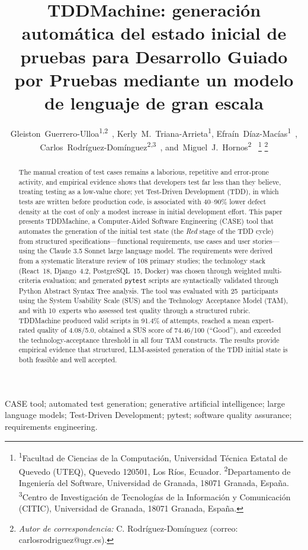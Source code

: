 \documentclass[10pt,journal,twoside,letterpaper]{IEEEtran}
\author{%
	Gleiston~Guerrero-Ulloa\textsuperscript{1,2}~\orcidlink{0000-0001-5990-2357},
	Kerly~M.~Triana-Arrieta\textsuperscript{1},
	Efraín~Díaz-Macías\textsuperscript{1}~\orcidlink{0000-0003-4087-029X},
	Carlos~Rodríguez-Domínguez\textsuperscript{2,3}~\orcidlink{0000-0001-5626-3115},
	and~Miguel~J.~Hornos\textsuperscript{2}~\orcidlink{0000-0001-5722-9816}%
	\thanks{\textsuperscript{1}Facultad de Ciencias de la Computación, Universidad Técnica Estatal de Quevedo (UTEQ), Quevedo 120501, Los Ríos, Ecuador. \textsuperscript{2}Departamento de Ingeniería del Software, Universidad de Granada, 18071 Granada, España. \textsuperscript{3}Centro de Investigación de Tecnologías de la Información y Comunicación (CITIC), Universidad de Granada, 18071 Granada, España.}%
	\thanks{\emph{Autor de correspondencia:} C. Rodríguez-Domínguez (correo: carlosrodriguez@ugr.es).}%
}
\begin{document}
	\IEEEoverridecommandlockouts

	\title{TDDMachine: generación automática del estado inicial de pruebas para Desarrollo Guiado por Pruebas mediante un modelo de lenguaje de gran escala}

	\maketitle
	\thispagestyle{enfoqueutefirstpage}

	\begin{abstract}
		The manual creation of test cases remains a laborious, repetitive and error-prone activity, and empirical evidence shows that developers test far less than they believe, treating testing as a low-value chore; yet Test-Driven Development (TDD), in which tests are written before production code, is associated with 40--90\% lower defect density at the cost of only a modest increase in initial development effort. This paper presents TDDMachine, a Computer-Aided Software Engineering (CASE) tool that automates the generation of the initial test state (the \emph{Red} stage of the TDD cycle) from structured specifications---functional requirements, use cases and user stories---using the Claude 3.5 Sonnet large language model. The requirements were derived from a systematic literature review of 108 primary studies; the technology stack (React~18, Django~4.2, PostgreSQL~15, Docker) was chosen through weighted multi-criteria evaluation; and generated \texttt{pytest} scripts are syntactically validated through Python Abstract Syntax Tree analysis. The tool was evaluated with 25~participants using the System Usability Scale (SUS) and the Technology Acceptance Model (TAM), and with 10~experts who assessed test quality through a structured rubric. TDDMachine produced valid scripts in 91.4\% of attempts, reached a mean expert-rated quality of 4.08/5.0, obtained a SUS score of 74.46/100 (``Good''), and exceeded the technology-acceptance threshold in all four TAM constructs. The results provide empirical evidence that structured, LLM-assisted generation of the TDD initial state is both feasible and well accepted.
	\end{abstract}

	\begin{IEEEkeywords}
		CASE tool; automated test generation; generative artificial intelligence; large language models; Test-Driven Development; pytest; software quality assurance; requirements engineering.
	\end{IEEEkeywords}
\end{document}
